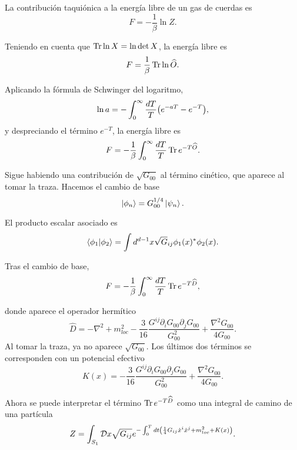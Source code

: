 La contribución taquiónica a la energía libre de un gas de cuerdas es
\begin{equation}
  F=-\frac{1}{\beta}\ln Z. 
\end{equation}

Teniendo en cuenta que $\Tr \ln X = \ln \det X$, la energía libre es
\begin{equation}
  F=\frac{1}{\beta} \Tr \ln \widehat O.
\end{equation}

Aplicando la fórmula de Schwinger del logaritmo, 
\begin{equation}
  \ln a = -\int_0^\infty \frac{dT}{T}\qty(e^{-aT}-e^{-T}),
\end{equation}
y despreciando el término $e^{-T}$, la energía libre es
\begin{equation}
  F=-\frac{1}{\beta}\int_0^\infty \frac{dT}{T} \Tr e^{-T\widehat O}.
\end{equation}

Sigue habiendo una contribución de $\sqrt{G_{00}}$ al término cinético, que aparece al tomar la traza.
Hacemos el cambio de base
\begin{equation}
  \ket{\phi_n}=G_{00}^{1/4}  \ket{\psi_n}.
\end{equation}

El producto escalar asociado es
\begin{equation}
  \braket{\phi_1}{\phi_2} = \int d^{d-1} x \sqrt G_{ij} \phi_1(x)^* \phi_2(x).
\end{equation}

Tras el cambio de base,
\begin{equation}
  F=-\frac{1}{\beta}\int_0^\infty \frac{dT}{T} \Tr e^{-T\widehat D},
\end{equation}

donde aparece el operador hermítico
\begin{equation}
  \widehat D = -\nabla^2  + m_{loc}^2- \frac{3}{16}\frac{G^{ij} \partial_i G_{00}\partial_j G_{00}}{G_{00}^2}
  +\frac{\nabla^2 G_{00}}{4G_{00}}.
\end{equation}
Al tomar la traza, ya no aparece $\sqrt{G_{00}}$.
Los últimos dos términos se corresponden con un potencial efectivo
\begin{equation}
  K(x) = -\frac{3}{16}\frac{G^{ij} \partial_i G_{00}\partial_j G_{00}}{G_{00}^2}
  +\frac{\nabla^2 G_{00}}{4G_{00}}.
\end{equation}

Ahora se puede interpretar el término $\Tr e^{-T\widehat{D}}$ como una integral de camino
de una partícula 
\begin{equation}
Z=  \int_{S_1} \mathcal D x \sqrt{G_{ij}} e^{-\int_0^T dt \qty(\frac{1}{4}G_{ij}\dot x^i\dot x^j+m_{loc}^2+K(x))}.
\end{equation}

